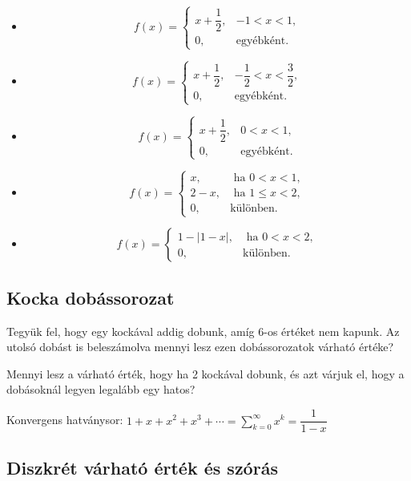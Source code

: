 \documentclass[a4paper]{article}
\begin{document}
\begin{itemize}
\item[a.]
\[
f(x) =
\begin{cases}
x + \dfrac{1}{2}, & -1 < x < 1, \\
0, & \text{egyébként}.
\end{cases}
\]
\item[b.]
\[
f(x) =
\begin{cases}
x + \dfrac{1}{2}, & -\dfrac{1}{2} < x < \dfrac{3}{2}, \\
0, & \text{egyébként}.
\end{cases}
\]
\item[c.]
\[
f(x) =
\begin{cases}
x + \dfrac{1}{2}, & 0 < x < 1, \\
0, & \text{egyébként}.
\end{cases}
\]
\item[d.]
\[
f(x) =
\begin{cases}
x, & \text{ ha } 0 < x < 1, \\
2 - x, & \text{ ha } 1 \leq x < 2, \\
0, & \text{különben}.
\end{cases}
\]
\item[e.]
\[
f(x) =
\begin{cases}
1 - |1 - x|, & \text{ ha } 0 < x < 2, \\
0, & \text{különben}.
\end{cases}
\]
\end{itemize}

\subsection{Kocka dobássorozat}

Tegyük fel, hogy egy kockával addig dobunk, amíg 6-os értéket nem kapunk.
Az utolsó dobást is beleszámolva mennyi lesz ezen dobássorozatok várható értéke?

\bigskip

Mennyi lesz a várható érték, hogy ha 2 kockával dobunk, és azt várjuk el, hogy a dobásoknál legyen legalább egy hatos?

\bigskip

Konvergens hatványsor:
\(
1 + x + x^2 + x^3 + \cdots =
\displaystyle \sum_{k=0}^{\infty} x^k =
\dfrac{1}{1 - x}
\)

\subsection{Diszkrét várható érték és szórás}
\end{document}
